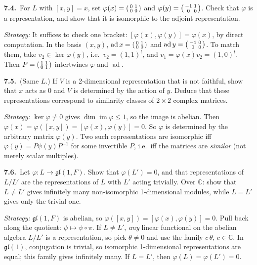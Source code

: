 \documentclass[11pt]{article}
\DeclareMathOperator{\im}{im}
\DeclareMathOperator{\ad}{ad}
\newcommand{\gl}{\mathfrak{gl}}
\newcommand{\prob}[3]{%
	\par\medskip\noindent\textbf{#1.}\ #2\par
	\noindent\hspace*{1.5em}\begin{minipage}[t]{\dimexpr\linewidth-1.5em}
		\textit{Strategy:} #3
	\end{minipage}\par}
\begin{document}
\prob{7.4}{For $L$ with $[x,y] = x$, set $\varphi(x) = \begin{psmallmatrix}0&1\\0&0\end{psmallmatrix}$ and $\varphi(y) = \begin{psmallmatrix}-1&1\\0&0\end{psmallmatrix}$.
	Check that $\varphi$ is a representation, and show that it is isomorphic to the adjoint representation.}
{It suffices to check one bracket: $[\varphi(x),\varphi(y)] = \varphi(x)$, by direct computation.
	In the basis $(x,y)$, $\ad x = \begin{psmallmatrix}0&1\\0&0\end{psmallmatrix}$ and $\ad y = \begin{psmallmatrix}-1&0\\0&0\end{psmallmatrix}$.
	To match them, take $v_2 \in \ker\varphi(y)$, i.e.\ $v_2 = (1,1)^t$, and $v_1 = \varphi(x)v_2 = (1,0)^t$.
	Then $P = \begin{psmallmatrix}1&1\\0&1\end{psmallmatrix}$ intertwines $\varphi$ and $\ad$.}

\prob{7.5}{(Same $L$.) If $V$ is a 2-dimensional representation that is not faithful, show that $x$ acts as $0$ and $V$ is determined by the action of $y$.
	Deduce that these representations correspond to similarity classes of $2\times 2$ complex matrices.}
{$\ker\varphi \ne 0$ gives $\dim\im\varphi \le 1$, so the image is abelian.
	Then $\varphi(x) = \varphi([x,y]) = [\varphi(x),\varphi(y)] = 0$.
	So $\varphi$ is determined by the arbitrary matrix $\varphi(y)$.
	Two such representations are isomorphic iff $\varphi(y) = P\psi(y)P^{-1}$ for some invertible $P$, i.e.\ iff the matrices are \emph{similar} (not merely scalar multiples).}

\prob{7.6}{Let $\varphi : L \to \gl(1,F)$.
	Show that $\varphi(L') = 0$, and that representations of $L/L'$ are the representations of $L$ with $L'$ acting trivially.
	Over $\mathbb{C}$: show that $L \ne L'$ gives infinitely many non-isomorphic 1-dimensional modules, while $L = L'$ gives only the trivial one.}
{$\gl(1,F)$ is abelian, so $\varphi([x,y]) = [\varphi(x),\varphi(y)] = 0$.
	Pull back along the quotient: $\psi \mapsto \psi \circ \pi$.
	If $L \ne L'$, \emph{any} linear functional on the abelian algebra $L/L'$ is a representation, so pick $\theta \ne 0$ and use the family $c\,\theta$, $c \in \mathbb{C}$.
	In $\gl(1)$, conjugation is trivial, so isomorphic 1-dimensional representations are equal; this family gives infinitely many.
	If $L = L'$, then $\varphi(L) = \varphi(L') = 0$.}
\end{document}
